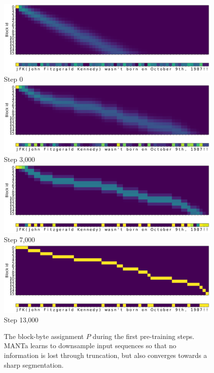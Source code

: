 \begin{figure}[t]
    \centering\small
    \includegraphics[width=0.85\columnwidth]{sources/part_2/manta/images/mapping_example_0.png}\\
    Step 0\\[2mm]
    \includegraphics[width=0.85\columnwidth]{sources/part_2/manta/images/mapping_example_3000.png}\\
    Step 3,000\\[2mm]
    \includegraphics[width=0.85\columnwidth]{sources/part_2/manta/images/mapping_example_7000.png}\\
    Step 7,000\\[2mm]
    \includegraphics[width=0.85\columnwidth]{sources/part_2/manta/images/mapping_example_13000.png}\\
    Step 13,000\\
    \caption{The block-byte assignment $P$ during the first pre-training steps. MANTa learns to downsample input sequences so that no information is lost through truncation, but also converges towards a sharp segmentation.}
    \label{fig:mapping_example}
\end{figure}


